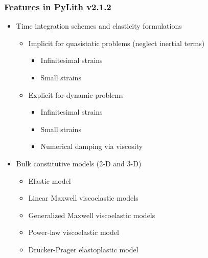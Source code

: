 \documentclass{beamer}
\begin{document}
\begin{frame}
  \frametitle{Features in PyLith v2.1.2}

  \begin{itemize}
  \item Time integration schemes and elasticity formulations
    \begin{itemize}
    \item Implicit for quasistatic problems (neglect inertial terms)
      \begin{itemize}
      \item Infinitesimal strains
      \item Small strains
      \end{itemize}
    \item Explicit for dynamic problems
      \begin{itemize}
      \item Infinitesimal strains
      \item Small strains
      \item Numerical damping via viscosity
     \end{itemize}
    \end{itemize}
  \item Bulk constitutive models (2-D and 3-D)
    \begin{itemize}
    \item Elastic model 
    \item Linear Maxwell viscoelastic models
    \item Generalized Maxwell viscoelastic models
    \item Power-law viscoelastic model
    \item Drucker-Prager elastoplastic model
    \end{itemize}
 \end{itemize}

\end{frame}
\end{document}
